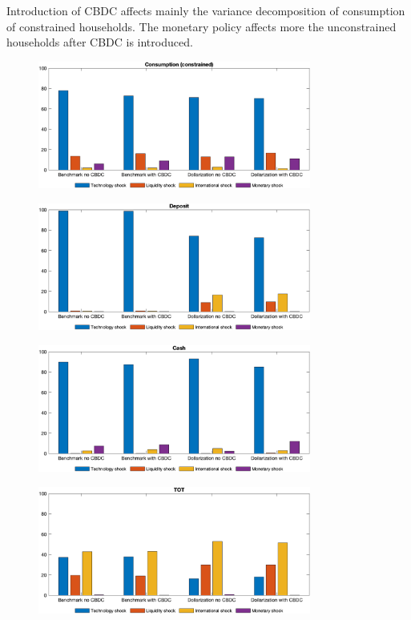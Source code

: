 \documentclass[12pt]{article}
\begin{document}
Introduction of CBDC affects mainly the variance decomposition of consumption of constrained households. The monetary policy affects more the unconstrained households after CBDC is introduced. 

\begin{figure}[h!]
\centering
\includegraphics[width=0.8\textwidth]{log_c2}
\end{figure}

\begin{figure}[h!]
\centering
\includegraphics[width=0.8\textwidth]{log_d1}
\end{figure}

\begin{figure}[h!]
\centering
\includegraphics[width=0.8\textwidth]{log_m2}
\end{figure}

\begin{figure}[h!]
\centering
\includegraphics[width=0.8\textwidth]{log_tot}
\end{figure}
\end{document}
